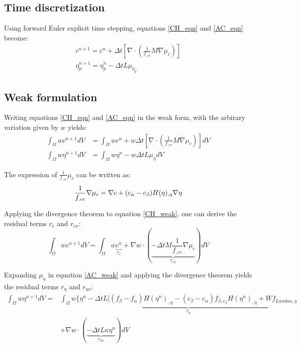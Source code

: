 \documentclass[11pt]{article}
\renewcommand{\=}[1]{\stackrel{#1}{=}} %
\theoremstyle{definition}
\theoremstyle{remark}
\begin{document}
\subsection{Time discretization}
Using forward Euler explicit time stepping, equations \ref{CH_eqn} and \ref{AC_eqn} become:
\begin{align}
c^{n+1} = c^{n}+\Delta t \left[\nabla \cdot \left(\frac{1}{f_{,cc}} M \nabla \mu_c \right) \right]\\
\eta_p^{n+1} = \eta_p^n -\Delta t L \mu_{\eta_p}
\end{align}

\subsection{Weak formulation}
Writing equations \ref{CH_eqn} and \ref{AC_eqn} in the weak form, with the arbirary variation given by $w$ yields:
\begin{align}
\int_\Omega w c^{n+1} dV &= \int_\Omega wc^{n}+w  \Delta t \left[\nabla \cdot \left(\frac{1}{f_{,cc}}  M \nabla \mu_c \right) \right] dV \label{CH_weak} \\
\int_\Omega w \eta^{n+1} dV &= \int_\Omega w \eta^{n}-w  \Delta t L \mu_{\eta} dV  \label{AC_weak}
\end{align}

The expression of $\frac{1}{f_{,cc}} \mu_c$ can be written as:
\begin{equation}
\frac{1}{f_{,cc}}  \nabla \mu_c =  \nabla c + (c_{\alpha}-c_{\beta}) H(\eta)_{,\eta} \nabla \eta  \\
\end{equation}

Applying the divergence theorem to equation \ref{CH_weak}, one can derive the residual terms $r_c$ and $r_{cx}$:
\begin{equation}
\int_\Omega w c^{n+1} dV = \int_\Omega w\underbrace{c^{n}}_{r_c}+\nabla w \cdot (\underbrace{-\Delta t  M \frac{1}{f_{,cc}} \nabla \mu_c}_{r_{cx}} ) dV
\end{equation}

Expanding $\mu_{\eta}$ in equation \ref{AC_weak} and applying the divergence theorem yields the residual terms $r_{\eta}$ and $r_{\eta x}$:
\begin{equation}
\begin{split}
\int_\Omega w \eta^{n+1} dV = &\int_\Omega w \Bigg\{\underbrace{\eta^{n}-\Delta t L \bigg[(f_{\beta}-f_{\alpha})H(\eta^n)_{,\eta} -(c_{\beta}-c_{\alpha}) f_{\beta,c_{\beta}}H(\eta^n)_{,\eta} + W f_{Landau,\eta}}_{r_{\eta}}\\ 
&+ \nabla w \cdot (\underbrace{-\Delta t  L \kappa \eta^n}_{r_{\eta x}} ) dV 
\end{split}
\end{equation}
\end{document}
